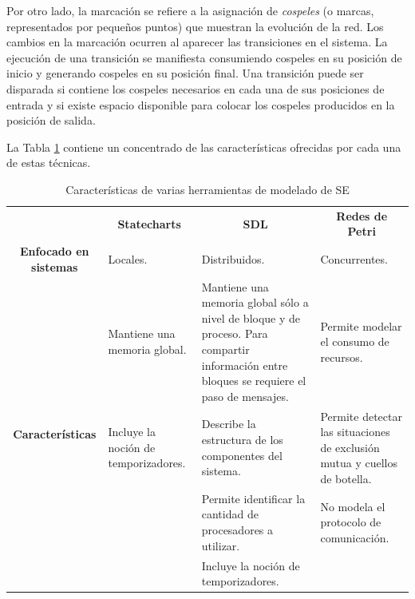 \documentclass[journal]{IEEEtran}
\begin{document}
Por otro lado, la marcación se refiere a la asignación de \emph{cospeles} (o marcas, representados por pequeños puntos) que muestran la evolución de la red.
Los cambios en la marcación ocurren al aparecer las transiciones en el sistema.
La ejecución de una transición se manifiesta consumiendo cospeles en su posición de inicio y generando cospeles en su posición final.
Una transición puede ser disparada si contiene los cospeles necesarios en cada una de sus posiciones de entrada y si existe espacio disponible para colocar los cospeles producidos en la posición de salida.

La Tabla \ref{tbl:caracteristicas-herramientas-modelado} contiene un concentrado de las características ofrecidas por cada una de estas técnicas.

\newcommand{\hdrule}{\midrule[\heavyrulewidth]}
\begin{table}[!t]
\renewcommand{\arraystretch}{1.3}
\caption{Características de varias herramientas de modelado de SE}
\label{tbl:caracteristicas-herramientas-modelado}
\centering
\begin{tabular}{lp{4cm}p{4cm}p{4cm}}
\toprule

   & \multicolumn{1}{c}{\textbf{Statecharts}} & \multicolumn{1}{c}{\textbf{SDL}} &  \multicolumn{1}{c}{\textbf{Redes de Petri}}\\
\cmidrule[\heavyrulewidth]{2-4}

\multicolumn{1}{c}{\textbf{Enfocado en sistemas}} &
Locales. &
Distribuidos. &
Concurrentes.\\

\cmidrule[\heavyrulewidth]{2-4}
\multicolumn{1}{c}{\multirow{5}{*}[-30pt]{\textbf{Características}}} & 
Mantiene una memoria global. &
Mantiene una memoria global sólo a nivel de bloque y de proceso. Para compartir información entre bloques se requiere el paso de mensajes.&
Permite modelar el consumo de recursos.\\
\cmidrule{2-4}
 & 
Incluye la noción de temporizadores. &
Describe la estructura de los componentes del sistema.&
Permite detectar las situaciones de exclusión mutua y cuellos de botella.\\
\cmidrule{2-4}
 & 
 &
Permite identificar la cantidad de procesadores a utilizar.&
No modela el protocolo de comunicación.\\
\cmidrule{2-4}
 & 
 &
Incluye la noción de temporizadores.&
\\

\bottomrule
\end{tabular}
\end{table}
\end{document}
